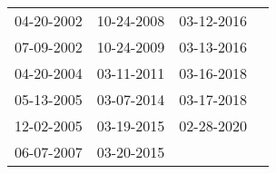 \begin{supertabular}{llll}
 04-20-2002 &  10-24-2008 &  03-12-2016 \\
 07-09-2002 &  10-24-2009 &  03-13-2016 \\
 04-20-2004 &  03-11-2011 &  03-16-2018 \\
 05-13-2005 &  03-07-2014 &  03-17-2018 \\
 12-02-2005 &  03-19-2015 &  02-28-2020 \\
 06-07-2007 &  03-20-2015 &             \\
\end{supertabular}

